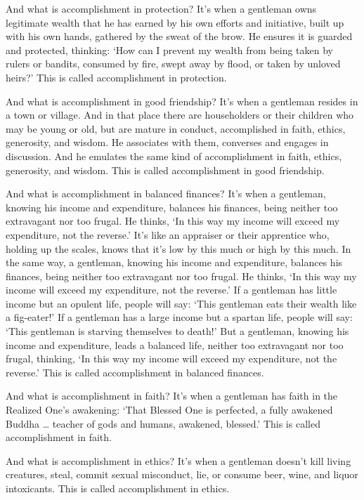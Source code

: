 \documentclass[12pt,openany]{book}%
\begin{document}
And what is accomplishment in protection? It’s when a gentleman owns legitimate wealth that he has earned by his own efforts and initiative, built up with his own hands, gathered by the sweat of the brow. He ensures it is guarded and protected, thinking: ‘How can I prevent my wealth from being taken by rulers or bandits, consumed by fire, swept away by flood, or taken by unloved heirs?’ This is called accomplishment in protection. 

And what is accomplishment in good friendship? It’s when a gentleman resides in a town or village. And in that place there are householders or their children who may be young or old, but are mature in conduct, accomplished in faith, ethics, generosity, and wisdom. He associates with them, converses and engages in discussion. And he emulates the same kind of accomplishment in faith, ethics, generosity, and wisdom. This is called accomplishment in good friendship. 

And what is accomplishment in balanced finances? It’s when a gentleman, knowing his income and expenditure, balances his finances, being neither too extravagant nor too frugal. He thinks, ‘In this way my income will exceed my expenditure, not the reverse.’ It’s like an appraiser or their apprentice who, holding up the scales, knows that it’s low by this much or high by this much. In the same way, a gentleman, knowing his income and expenditure, balances his finances, being neither too extravagant nor too frugal. He thinks, ‘In this way my income will exceed my expenditure, not the reverse.’ If a gentleman has little income but an opulent life, people will say: ‘This gentleman eats their wealth like a fig-eater!’ If a gentleman has a large income but a spartan life, people will say: ‘This gentleman is starving themselves to death!’ But a gentleman, knowing his income and expenditure, leads a balanced life, neither too extravagant nor too frugal, thinking, ‘In this way my income will exceed my expenditure, not the reverse.’ This is called accomplishment in balanced finances. 

And what is accomplishment in faith? It’s when a gentleman has faith in the Realized One’s awakening: ‘That Blessed One is perfected, a fully awakened Buddha … teacher of gods and humans, awakened, blessed.’ This is called accomplishment in faith. 

And what is accomplishment in ethics? It’s when a gentleman doesn’t kill living creatures, steal, commit sexual misconduct, lie, or consume beer, wine, and liquor intoxicants. This is called accomplishment in ethics. 
\end{document}
